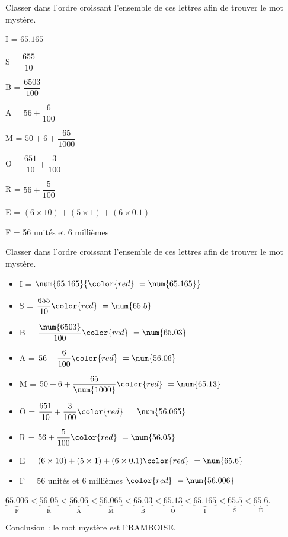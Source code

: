 \begin{exercice} %
    Classer dans l'ordre croissant l'ensemble de ces lettres afin de trouver le mot mystère.        
        \begin{itemize}
            \begin{spacing}{2}
            \item I = $\num{65.165}$
            \item S = $\dfrac{655}{10}$
            \item B = $\dfrac{\num{6503}}{100}$
            \item A = $56+\dfrac{6}{100}$
            \item M = $50+6+\dfrac{65}{\num{1000}}$
            \item O = $\dfrac{651}{10}+\dfrac{3}{100}$
            \item R = $56+\dfrac{5}{100}$
            \item E = $(6\times10)+(5\times1)+(6\times0.1)$
            \item F = 56 unités et 6 millièmes
        \end{spacing}
        \end{itemize}    
\end{exercice}
\begin{corrige}
    Classer dans l'ordre croissant l'ensemble de ces lettres afin de trouver le mot mystère.    
    \begin{spacing}{2}
        \begin{itemize}
            \item I = $\num{65.165}                  {\color{red} ~= \num{65.165}}$
            \item S = $\dfrac{655}{10}               {\color{red} ~= \num{65.5}  }$
            \item B = $\dfrac{\num{6503}}{100}       {\color{red} ~= \num{65.03} }$
            \item A = $56+\dfrac{6}{100}             {\color{red} ~= \num{56.06} }$
            \item M = $50+6+\dfrac{65}{\num{1000}}   {\color{red} ~= \num{65.13} }$
            \item O = $\dfrac{651}{10}+\dfrac{3}{100}{\color{red} ~= \num{56.065}}$
            \item R = $56+\dfrac{5}{100}             {\color{red} ~= \num{56.05} }$
            \item E = $(6\times10)+(5\times1)+(6\times0.1) {\color{red} ~= \num{65.6}  }$
            \item F = 56 unités et 6 millièmes ${\color{red} ~=            \num{56.006}}$
        \end{itemize}  
    \end{spacing}

    \medskip
    {\scriptsize $\underbrace{\num{65.006}}_\text{F} < \underbrace{\num{56.05}}_\text{R} < \underbrace{\num{56.06}}_\text{A} < \underbrace{\num{56.065}}_\text{M} < \underbrace{\num{65.03}}_\text{B} < \underbrace{\num{65.13}}_\text{O} < \underbrace{\num{65.165}}_\text{I} < \underbrace{\num{65.5}}_\text{S} < \underbrace{\num{65.6}}_\text{E}$}.

    \medskip
    Conclusion : le mot mystère est \red FRAMBOISE.
 \end{corrige}